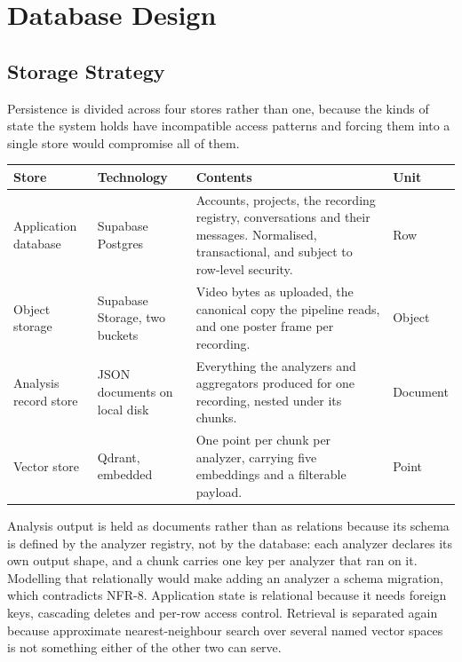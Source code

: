 \section{Database Design}

\subsection{Storage Strategy}

Persistence is divided across four stores rather than one, because the kinds of state the
system holds have incompatible access patterns and forcing them into a single store would
compromise all of them.

\begin{table}[htbp]
\centering
\small
\begin{tabularx}{\textwidth}{@{}L{3.1cm}L{3.2cm}XL{1.9cm}@{}}
\toprule
\textbf{Store} & \textbf{Technology} & \textbf{Contents} & \textbf{Unit} \\
\midrule
Application database & Supabase Postgres &
Accounts, projects, the recording registry, conversations and their messages. Normalised,
transactional, and subject to row-level security. & Row \\
Object storage & Supabase Storage, two buckets &
Video bytes as uploaded, the canonical copy the pipeline reads, and one poster frame per
recording. & Object \\
Analysis record store & JSON documents on local disk &
Everything the analyzers and aggregators produced for one recording, nested under its
chunks. & Document \\
Vector store & Qdrant, embedded &
One point per chunk per analyzer, carrying five embeddings and a filterable payload. &
Point \\
\bottomrule
\end{tabularx}
\end{table}

Analysis output is held as documents rather than as relations because its schema is
defined by the analyzer registry, not by the database: each analyzer declares its own
output shape, and a chunk carries one key per analyzer that ran on it. Modelling that
relationally would make adding an analyzer a schema migration, which contradicts NFR-8.
Application state is relational because it needs foreign keys, cascading deletes and
per-row access control. Retrieval is separated again because approximate
nearest-neighbour search over several named vector spaces is not something either of the
other two can serve.

